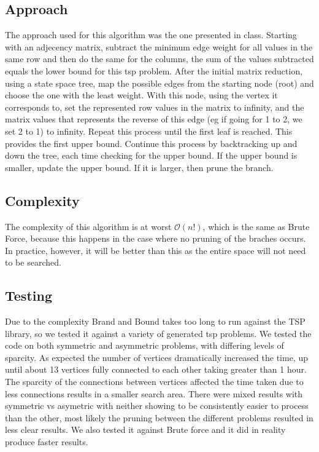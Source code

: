 \documentclass[11pt, english]{article}
\begin{document}
\subsection{Approach}
The approach used for this algorithm was the one presented in class. Starting with an adjecency matrix, subtract the minimum edge weight for all values in the same row and then do the same for the columns, the sum of the values subtracted equals the lower bound for this tsp problem. After the initial matrix reduction, using a state space tree, map the possible edges from the starting node (root) and choose the one with the least weight. With this node, using the vertex it corresponds to, set the represented row values in the matrix to infinity, and the matrix values that represents the reverse of this edge (eg if going for 1 to 2, we set 2 to 1) to infinity. Repeat this process until the first leaf is reached. This provides the first upper bound. 
Continue this process by backtracking up and down the tree, each time checking for the upper bound. If the upper bound is smaller, update the upper bound. If it is larger, then prune the branch.

\subsection{Complexity}
\noindent
The complexity of this algorithm is at worst $\mathcal{O}(n!)$, which is the same as Brute Force, because this happens in the case where no pruning of the braches occurs. In practice, however, it will be better than this as the entire space will not need to be searched.

\subsection{Testing}
Due to the complexity Brand and Bound takes too long to run against the TSP library, so we tested it against a variety of generated tsp problems. We tested the code on both symmetric and asymmetric problems, with differing levels of sparcity. As expected the number of vertices dramatically increased the time, up until about 13 vertices fully connected to each other taking greater than 1 hour. \newline 
The sparcity of the connections between vertices affected the time taken due to less connections results in a smaller search area. There were mixed results with symmetric vs asymetric with neither showing to be consistently easier to process than the other, most likely the pruning between the different problems resulted in less clear results. We also tested it against Brute force and it did in reality produce faster results.
\end{document}
